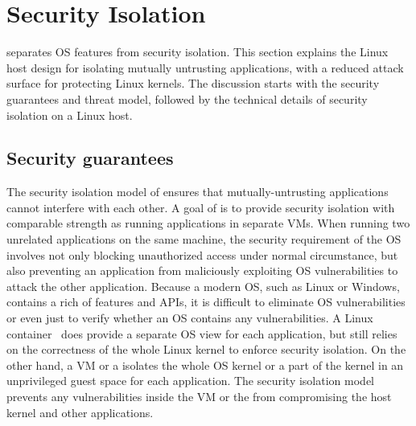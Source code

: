 \section{Security Isolation}
\label{sec:linux:security}

\graphene{} separates OS features from security isolation.
This section explains the Linux host design for isolating mutually untrusting applications, with a reduced attack surface for protecting Linux kernels.
The discussion starts with the security guarantees and threat model, followed by the technical details of security isolation on a Linux host.



\subsection{Security guarantees}

The security isolation model of \graphene{} ensures that mutually-untrusting applications cannot interfere with each other.
A goal of \graphene{} is to provide security isolation with comparable strength as
running applications in separate VMs.
When running two unrelated applications on the same machine,
the security requirement
of the OS involves not only blocking unauthorized access under normal circumstance,
but also preventing an application
from maliciously exploiting OS vulnerabilities to attack the other application.
Because a modern OS, such as Linux or Windows, contains a rich of features and APIs,
it is difficult to eliminate OS vulnerabilities
or even just to verify whether an OS contains any vulnerabilities. 
A Linux container~\cite{lxc}
does provide a separate OS view for each application,
but still relies on the correctness of the whole Linux kernel to enforce security isolation.
On the other hand, a VM or a \libos{}
isolates the whole OS kernel or a part of the kernel in an unprivileged guest space
for each application.
The security isolation model prevents
any vulnerabilities inside the VM or the \libos{} from compromising the host kernel and other applications.



